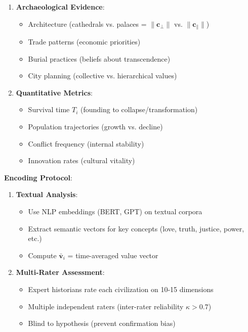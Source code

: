 \documentclass[11pt,a4paper]{article}
\theoremstyle{definition}
\theoremstyle{remark}
\newcommand{\cc}{\mathbf{c}}
\begin{document}
\begin{small}
\begin{enumerate}
\begin{protocol}
\begin{enumerate}
    \item \textbf{Archaeological Evidence}:
        \begin{itemize}[nosep]
            \item Architecture (cathedrals vs. palaces = \(\|\cc_\perp\|\) vs. \(\|\cc_\parallel\|\))
            \item Trade patterns (economic priorities)
            \item Burial practices (beliefs about transcendence)
            \item City planning (collective vs. hierarchical values)
        \end{itemize}
    
    \item \textbf{Quantitative Metrics}:
        \begin{itemize}[nosep]
            \item Survival time \(T_i\) (founding to collapse/transformation)
            \item Population trajectories (growth vs. decline)
            \item Conflict frequency (internal stability)
            \item Innovation rates (cultural vitality)
        \end{itemize}
\end{enumerate}

\textbf{Encoding Protocol}:
\begin{enumerate}
    \item \textbf{Textual Analysis}:
        \begin{itemize}
            \item Use NLP embeddings (BERT, GPT) on textual corpora
            \item Extract semantic vectors for key concepts (love, truth, justice, power, etc.)
            \item Compute \(\bar{\mathbf{v}}_i\) = time-averaged value vector
        \end{itemize}
    
    \item \textbf{Multi-Rater Assessment}:
        \begin{itemize}
            \item Expert historians rate each civilization on 10-15 dimensions
            \item Multiple independent raters (inter-rater reliability \(\kappa > 0.7\))
            \item Blind to hypothesis (prevent confirmation bias)
        \end{itemize}
    

\end{enumerate}
\end{protocol}
\end{enumerate}
\end{small}
\end{document}

